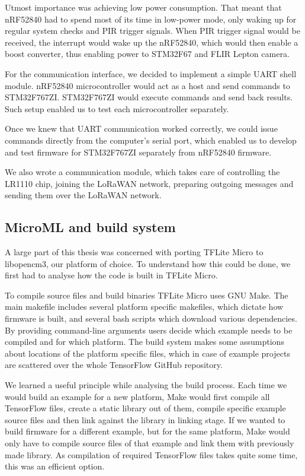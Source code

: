 Utmost importance was achieving low power consumption.
That meant that nRF52840 had to spend most of its time in low-power mode, only waking up for regular system checks and PIR trigger signals.
When PIR trigger signal would be received, the interrupt would wake up the nRF52840, which would then enable a boost converter, thus enabling power to STM32F67 and FLIR Lepton camera.

For the communication interface, we decided to implement a simple UART shell module.
nRF52840 microcontroller would act as a host and send commands to STM32F767ZI.
STM32F767ZI would execute commands and send back results.
Such setup enabled us to test each microcontroller separately.

Once we knew that UART communication worked correctly, we could issue commands directly from the computer's serial port, which enabled us to develop and test firmware for STM32F767ZI separately from nRF52840 firmware.

We also wrote a communication module, which takes care of controlling the LR1110 chip, joining the LoRaWAN network, preparing outgoing messages and sending them over the LoRaWAN network.


\subsection{ MicroML and build system} \label{build_system_label}

A large part of this thesis was concerned with porting TFLite Micro to libopencm3, our platform of choice.
To understand how this could be done, we first had to analyse how the code is built in TFLite Micro.

To compile source files and build binaries TFLite Micro uses GNU Make.
The main makefile includes several platform specific makefiles, which dictate how firmware is built, and several bash scripts which download various dependencies.
By providing command-line arguments users decide which example needs to be compiled and for which platform.
The build system makes some assumptions about locations of the platform specific files, which in case of example projects are scattered over the whole TensorFlow GitHub repository.

We learned a useful principle while analysing the build process. 
Each time we would build an example for a new platform, Make would first compile all TensorFlow files, create a static library out of them, compile specific example source files and then link against the library in linking stage.
If we wanted to build firmware for a different example, but for the same platform, Make would only have to compile source files of that example and link them with previously made library.
As compilation of required TensorFlow files takes quite some time, this was an efficient option.

